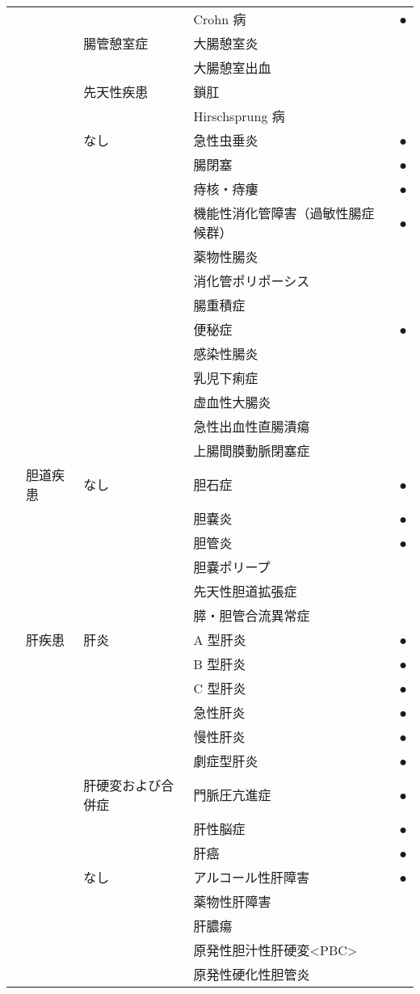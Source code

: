 \begin{xltabular}{\linewidth}{XXXXX}
 &  &  & Crohn 病 & ● \\
 &  & 腸管憩室症 & 大腸憩室炎 &  \\
 &  &  & 大腸憩室出血 &  \\
 &  & 先天性疾患 & 鎖肛 &  \\
 &  &  & Hirschsprung 病 &  \\
 &  & なし & 急性虫垂炎 & ● \\
 &  &  & 腸閉塞 & ● \\
 &  &  & 痔核・痔瘻 & ● \\
 &  &  & 機能性消化管障害（過敏性腸症候群） & ● \\
 &  &  & 薬物性腸炎 &  \\
 &  &  & 消化管ポリポーシス &  \\
 &  &  & 腸重積症 &  \\
 &  &  & 便秘症 & ● \\
 &  &  & 感染性腸炎 &  \\
 &  &  & 乳児下痢症 &  \\
 &  &  & 虚血性大腸炎 &  \\
 &  &  & 急性出血性直腸潰瘍 &  \\
 &  &  & 上腸間膜動脈閉塞症 &  \\
 & 胆道疾患 & なし & 胆石症 & ● \\
 &  &  & 胆嚢炎 & ● \\
 &  &  & 胆管炎 & ● \\
 &  &  & 胆嚢ポリープ &  \\
 &  &  & 先天性胆道拡張症 &  \\
 &  &  & 膵・胆管合流異常症 &  \\
 & 肝疾患 & 肝炎 & A 型肝炎 & ● \\
 &  &  & B 型肝炎 & ● \\
 &  &  & C 型肝炎 & ● \\
 &  &  & 急性肝炎 & ● \\
 &  &  & 慢性肝炎 & ● \\
 &  &  & 劇症型肝炎 & ● \\
 &  & 肝硬変および合併症 & 門脈圧亢進症 & ● \\
 &  &  & 肝性脳症 & ● \\
 &  &  & 肝癌 & ● \\
 &  & なし & アルコール性肝障害 & ● \\
 &  &  & 薬物性肝障害 &  \\
 &  &  & 肝膿瘍 &  \\
 &  &  & 原発性胆汁性肝硬変<PBC> &  \\
 &  &  & 原発性硬化性胆管炎 &  \\

\end{xltabular}

